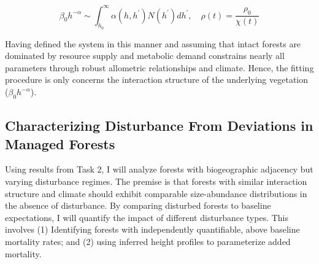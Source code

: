 \begin{equation}
    \beta_{0}h^{-\alpha} \sim \int_{h_{0}}^{\infty} \alpha(h, h^{\prime})N(h^{\prime})dh^{\prime}, \quad \rho(t) = \dfrac{\rho_{0}}{\chi(t)}
\end{equation}


Having defined the system in this manner and assuming that intact forests are dominated by resource supply and metabolic demand constrains nearly all parameters through robust allometric relationships and climate. Hence, the fitting procedure is only concerns the interaction structure of the underlying vegetation ($\beta_{0}h^{-\alpha}$).

\subsection{Characterizing Disturbance From Deviations in Managed Forests}

Using results from Task 2, I will analyze forests with biogeographic adjacency but varying disturbance regimes. The premise is that forests with similar interaction structure and climate should exhibit comparable size-abundance distributions in the absence of disturbance. By comparing disturbed forests to baseline expectations, I will quantify the impact of different disturbance types. This involves (1) Identifying forests with independently quantifiable, above baseline mortality rates; and (2) using inferred height profiles to parameterize added mortality.



